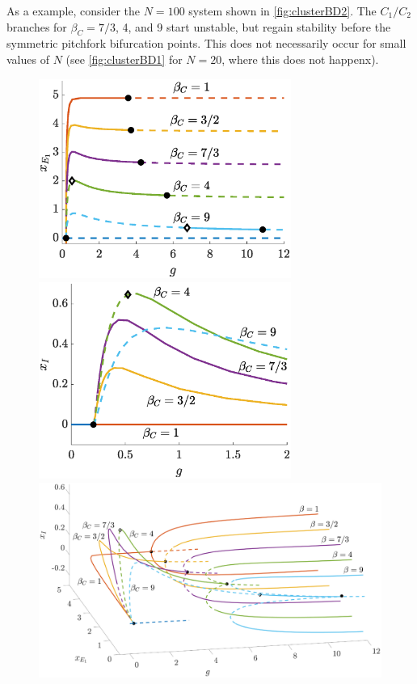 \documentclass[reqno]{siamonline190516}
\begin{document}
As a example, consider the $N=100$ system shown in \cref{fig:clusterBD2}. The $C_1/C_2$ branches for $\beta_C = 7/3$, 4, and 9 start unstable, but regain stability before the symmetric pitchfork bifurcation points. This does not necessarily occur for small values of $N$ (see \cref{fig:clusterBD1} for $N=20$, where this does not happenx).

\begin{figure}
    \centering
    \includegraphics[width=8.25cm]{bdclusters100c10E.eps}\hspace{-0.5cm}
    \includegraphics[width=8.25cm]{bdclusters100c10Izoom.eps} \\
    \vspace{-1cm}
    \hspace{-1cm} 
    \includegraphics[width=17.25cm]{bdclusters100c103D.eps}

\end{figure}
\end{document}
